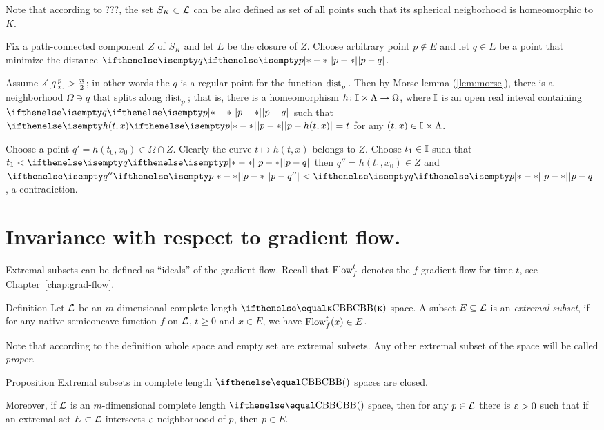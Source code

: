 Note that according to ???, the set $S_K\subset \spc{L}$ can be also defined as set of all points such that its spherical neigborhood is homeomorphic to $K$.

Fix a path-connected component $Z$ of $S_K$ and let $E$ be the closure of $Z$.
Choose arbitrary point $p\notin E$ and let $q\in E$ be a point that minimize the distance $\dist{p}{q}{}$.

Assume $\measuredangle[q\,{}^{p}_{x}]>\tfrac{\uppi}2$;
in other words the $q$ is a regular point for the function $\mathop{\rm dist}\nolimits_{p}^{{}}{}{}$.
Then by Morse lemma (\ref{lem:morse}),
there is a neighborhood $\Omega\ni q$ that splits along $\mathop{\rm dist}\nolimits_{p}^{{}}{}{}$;
that is, there is a homeomorphism $h\:\II\times \Lambda\to\Omega$,
where $\mathbb{I}$ is an open real inteval containing $\dist{p}{q}{}$
such that $\dist{p}{h(t,x)}{}=t$ for any $(t,x)\in \II\times \Lambda$.

Choose a point $q'=h(t_0,x_0)\in \Omega\cap Z$.
Clearly the curve $t\mapsto h(t,x)$ belongs to $Z$.
Choose $t_1\in \II$ such that $t_1<\dist{p}{q}{}$
then $q''=h(t_1,x_0)\in Z$ and $\dist{p}{q''}{}<\dist{p}{q}{}$,
a contradiction.
\qeds




\section{Invariance with respect to gradient flow.}

Extremal subsets can be defined as ``ideals'' of the gradient flow.
Recall that $\mathop{\rm Flow}\nolimits^t_f$ denotes the $f$-gradient flow for time $t$, 
see Chapter~\ref{chap:grad-flow}.

\begin{thm}{Definition}\label{def:extrim} 
Let $\mathcal{L}$ be an $m$-dimensional complete length $\Alex\kappa$ space.
A subset $E\subseteq \mathcal{L}$ is an \emph{extremal subset}, if for any native semiconcave function
$f$ on $\mathcal{L}$, 
$t\ge 0$ and $x\in E$, we have $\GF_f^t(x)\in E$.
\end{thm}

Note that according to the definition whole space and empty set are extremal subsets.
Any other extremal subset of the space will be called  \emph{proper}.

\begin{thm}{Proposition}\label{prop:extremal-closed-plus} 
Extremal subsets in complete length $\Alex{}$ spaces are closed.

Moreover, if $\mathcal{L}$ is an $m$-dimensional complete length $\Alex{}$ space, then for any $p\in \spc{L}$ there is $\upvarepsilon>0$
such that if an extremal set $E\subset \spc{L}$ intersects $\upvarepsilon$-neighborhood of $p$, then $p\in E$.
\end{thm}

